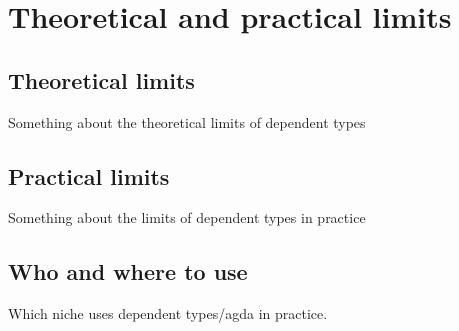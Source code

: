 \section{Theoretical and practical limits}
\subsection{Theoretical limits}
Something about the theoretical limits of dependent types
\subsection{Practical limits}
Something about the limits of dependent types in practice
\subsection{Who and where to use}
Which niche uses dependent types/agda in practice.
